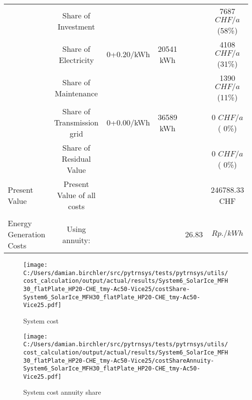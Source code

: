 \documentclass[english]{SPFShortReport}
\begin{document}
\begin{table}[!ht]
\begin{adjustbox}{max width =\textwidth}
\begin{tabular}{l | c c c c c }
 & Share of Investment & &&& 7687 $CHF/a$ (58\%) \\
 & Share of Electricity & 0+0.20/kWh & 20541 kWh &  & 4108 $CHF/a$ (31\%)\\
 & Share of Maintenance & &&& 1390 $CHF/a$ (11\%)\\ 
 & Share of Transmission grid & 0+0.00/kWh & 36589 kWh & &  0 $CHF/a$ ( 0\%)\\
 & Share of Residual Value &&& &  0 $CHF/a$ ( 0\%)\\
Present Value  & Present Value of all costs  & &&& 246788.33 CHF \\
\hline \\ 
 Energy Generation Costs & Using annuity: &&& 26.83 & $Rp./kWh$ \\
\hline
\hline
\end{tabular}
\end{adjustbox}
\label{CostsTable}
\end{table}
\begin{figure}[!htbp]
\begin{center}
\texttt{[image: C:/Users/damian.birchler/src/pytrnsys/tests/pytrnsys/utils/cost\_calculation/output/actual/results/System6\_SolarIce\_MFH30\_flatPlate\_HP20-CHE\_tmy-Ac50-Vice25/costShare-System6\_SolarIce\_MFH30\_flatPlate\_HP20-CHE\_tmy-Ac50-Vice25.pdf]}
\caption{System cost}
\label{systemCost}
\end{center}
\end{figure}
\begin{figure}[!htbp]
\begin{center}
\texttt{[image: C:/Users/damian.birchler/src/pytrnsys/tests/pytrnsys/utils/cost\_calculation/output/actual/results/System6\_SolarIce\_MFH30\_flatPlate\_HP20-CHE\_tmy-Ac50-Vice25/costShareAnnuity-System6\_SolarIce\_MFH30\_flatPlate\_HP20-CHE\_tmy-Ac50-Vice25.pdf]}
\caption{System cost annuity share}
\label{systemCostannuity}
\end{center}
\end{figure}
\end{document}
